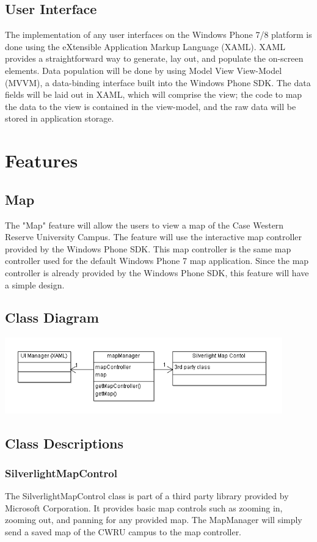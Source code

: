 \documentclass[pdftex,12pt,letter]{article}
\begin{document}
\subsection{User Interface}
The implementation of any user interfaces on the Windows Phone 7/8 platform is done using the eXtensible Application Markup Language (XAML). XAML provides a straightforward way to generate, lay out, and populate the on-screen elements. Data population will be done by using Model View View-Model (MVVM), a data-binding interface built into the Windows Phone SDK. The data fields will be laid out in XAML, which will comprise the view; the code to map the data to the view is contained in the view-model, and the raw data will be stored in application storage.
\\
\section{Features}
\subsection{Map}
The "Map" feature will allow the users to view a map of the Case Western Reserve University Campus. The feature will use the interactive map controller provided by the Windows Phone SDK. This map controller is the same map controller used for the default Windows Phone 7 map application. Since the map controller is already provided by the Windows Phone SDK, this feature will have a simple design.
\subsection{Class Diagram}
\includegraphics[width=120mm]{MapCD.png}
\subsection{Class Descriptions}
\subsubsection{SilverlightMapControl}
The SilverlightMapControl class is part of a third party library provided by Microsoft Corporation. It provides basic map controls such as zooming in, zooming out, and panning for any provided map. The MapManager will simply send a saved map of the CWRU campus to the map controller.
\end{document}
